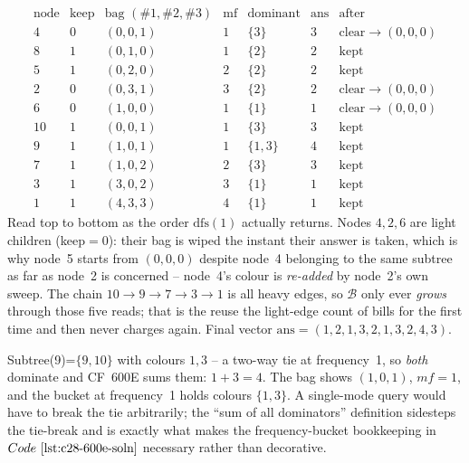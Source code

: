 \begin{tracebox}
{\small
\[
\renewcommand{\arraystretch}{1.18}
\begin{array}{c|c|c|c|c|c|c}
\text{node} & \text{keep} & \text{bag }(\#1,\#2,\#3) & \text{mf} & \text{dominant} & \text{ans} & \text{after}\\\hline
4  & 0 & (0,0,1) & 1 & \{3\}   & 3 & \text{clear}\to(0,0,0)\\
8  & 1 & (0,1,0) & 1 & \{2\}   & 2 & \text{kept}\\
5  & 1 & (0,2,0) & 2 & \{2\}   & 2 & \text{kept}\\
2  & 0 & (0,3,1) & 3 & \{2\}   & 2 & \text{clear}\to(0,0,0)\\
6  & 0 & (1,0,0) & 1 & \{1\}   & 1 & \text{clear}\to(0,0,0)\\
10 & 1 & (0,0,1) & 1 & \{3\}   & 3 & \text{kept}\\
9  & 1 & (1,0,1) & 1 & \{1,3\} & 4 & \text{kept}\\
7  & 1 & (1,0,2) & 2 & \{3\}   & 3 & \text{kept}\\
3  & 1 & (3,0,2) & 3 & \{1\}   & 1 & \text{kept}\\
1  & 1 & (4,3,3) & 4 & \{1\}   & 1 & \text{kept}
\end{array}
\]}
Read top to bottom as the order \(\mathrm{dfs}(1)\) actually returns.  Nodes
\(4,2,6\) are light children (keep\(=0\)): their bag is wiped the instant their
answer is taken, which is why node~5 starts from \((0,0,0)\) despite node~4
belonging to the same subtree as far as node~2 is concerned -- node~4's colour
is \emph{re-added} by node~2's own sweep.  The chain \(10\to9\to7\to3\to1\) is
all heavy edges, so \(\mathcal{B}\) only ever \emph{grows} through those five
reads; that is the reuse the light-edge count of  bills for the
first time and then never charges again.  Final vector
\(\mathrm{ans}=(1,2,1,3,2,1,3,2,4,3)\).
\end{tracebox}

\begin{insightbox}
Subtree(9)=\(\{9,10\}\) with colours \(1,3\) -- a two-way tie at frequency~1,
so \emph{both} dominate and CF~600E sums them: \(1+3=4\).  The bag shows
\((1,0,1)\), \(\mathit{mf}=1\), and the bucket at frequency~1 holds colours
\(\{1,3\}\).  A single-mode query would have to break the tie arbitrarily;
the ``sum of all dominators'' definition sidesteps the tie-break and is exactly
what makes the frequency-bucket bookkeeping in \(\coderef{c28-600e-soln}\)
necessary rather than decorative.
\end{insightbox}

